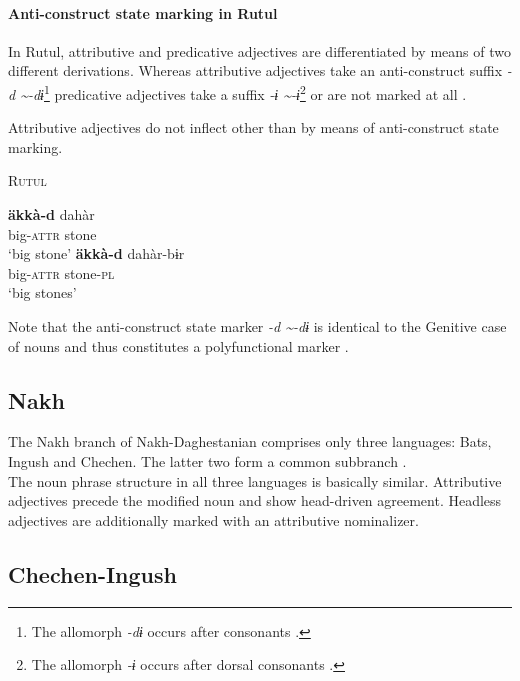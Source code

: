 \paragraph{Anti-construct state marking in Rutul}
In Rutul, attributive and predicative adjectives are differentiated by means of two different derivations. Whereas attributive adjectives take an anti-construct suffix \textit{-d \textasciitilde-dɨ}\footnote{The allomorph \textit{-dɨ} occurs after consonants \citep[224]{alekseev1994a}.} predicative adjectives take a suffix \textit{-ɨ \textasciitilde-ɨ}\footnote{The allomorph \textit{-ɨ} occurs after dorsal consonants \citep[224]{alekseev1994a}.} or are not marked at all \citep[224]{alekseev1994a}.

Attributive adjectives do not inflect other than by means of anti-construct state marking.
\begin{exe}
\ex \textsc{Rutul} \citep[237]{alekseev1994a}
\begin{xlist}
\ex
\gll	\textbf{äkkà-d} dahàr\\
	big-\textsc{attr} stone\\
\glt	‘big stone’
\ex
\gll	\textbf{äkkà-d} dahàr-bɨr\\
	big-\textsc{attr} stone-\textsc{pl}\\
\glt	‘big stones’
\end{xlist}
\end{exe}
Note that the anti-construct state marker \textit{-d \textasciitilde-dɨ} is identical to the Genitive case of nouns and thus constitutes a polyfunctional marker \cite{alekseev1994a}.

\subsection{Nakh}
The Nakh branch of Nakh-Daghestanian comprises only three languages: Bats, Ingush and Chechen. The latter two form a common subbranch \citep[220, 233]{salminen2007}.\\

\noindent The noun phrase structure in all three languages is basically similar. Attributive adjectives precede the modified noun and show head-driven agreement. Headless adjectives are additionally marked with an attributive nominalizer.

\subsection{Chechen-Ingush}\label{ingush synchr}
